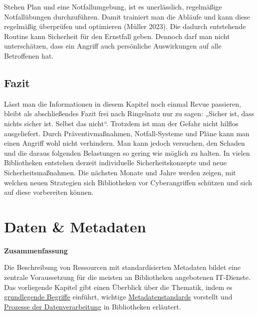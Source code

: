 \documentclass[
  11pt,
  letterpaper,
  DIV=11,
  twoside]{scrreprt}
\begin{document}
Stehen Plan und eine Notfallumgebung, ist es unerlässlich, regelmäßige
Notfallübungen durchzuführen. Damit trainiert man die Abläufe und kann
diese regelmäßig überprüfen und optimieren (Müller 2023). Die dadurch
entstehende Routine kann Sicherheit für den Ernstfall geben. Dennoch
darf man nicht unterschätzen, dass ein Angriff auch persönliche
Auswirkungen auf alle Betroffenen hat.

\section{Fazit}\label{fazit}

Lässt man die Informationen in diesem Kapitel noch einmal Revue
passieren, bleibt als abschließendes Fazit frei nach Ringelnatz nur zu
sagen: „Sicher ist, dass nichts sicher ist. Selbst das nicht``. Trotzdem
ist man der Gefahr nicht hilflos ausgeliefert. Durch Präventivmaßnahmen,
Notfall-Systeme und Pläne kann man einen Angriff wohl nicht verhindern.
Man kann jedoch versuchen, den Schaden und die daraus folgenden
Belastungen so gering wie möglich zu halten. In vielen Bibliotheken
entstehen derzeit individuelle Sicherheitskonzepte und neue
Sicherheitsmaßnahmen. Die nächsten Monate und Jahre werden zeigen, mit
welchen neuen Strategien sich Bibliotheken vor Cyberangriffen schützen
und sich auf diese vorbereiten können.


\chapter{Daten \& Metadaten}\label{sec-metadaten}

\begin{tcolorbox}[enhanced jigsaw, leftrule=.75mm, toprule=.15mm, left=2mm, opacityback=0, arc=.35mm, colback=white, breakable, colframe=quarto-callout-note-color-frame, rightrule=.15mm, bottomrule=.15mm]
\begin{minipage}[t]{5.5mm}
\textcolor{quarto-callout-note-color}{\faInfo}
\end{minipage}%
\begin{minipage}[t]{\textwidth - 5.5mm}

\vspace{-3mm}\textbf{Zusammenfassung}\vspace{3mm}

Die Beschreibung von Ressourcen mit standardisierten Metadaten bildet
eine zentrale Voraussetzung für die meisten an Bibliotheken angebotenen
IT-Dienste. Das vorliegende Kapitel gibt einen Überblick über die
Thematik, indem es
\hyperref[grundlegende-begrifflichkeiten]{grundlegende Begriffe}
einführt, wichtige \hyperref[metadatenstandards]{Metadatenstandards}
vorstellt und
\hyperref[datenverarbeitungsprozess-in-bibliotheken]{Prozesse der
Datenverarbeitung} in Bibliotheken erläutert.

\end{minipage}%
\end{tcolorbox}
\end{document}
